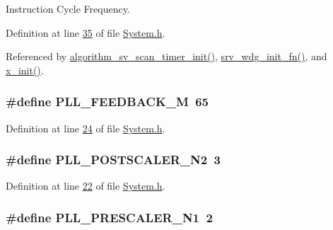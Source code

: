 Instruction Cycle Frequency. 



Definition at line \hyperlink{a00072_source_l00035}{35} of file \hyperlink{a00072_source}{System.\+h}.



Referenced by \hyperlink{a00038_source_l00543}{algorithm\+\_\+sv\+\_\+scan\+\_\+timer\+\_\+init()}, \hyperlink{a00066_source_l00096}{srv\+\_\+wdg\+\_\+init\+\_\+fn()}, and \hyperlink{a00037_source_l00135}{x\+\_\+init()}.

\hypertarget{a00072_a616f73024087cf3c328cde290113065a}{
\subsubsection[{P\+L\+L\+\_\+\+F\+E\+E\+D\+B\+A\+C\+K\+\_\+\+M}]{\setlength{\rightskip}{0pt plus 5cm}\#define P\+L\+L\+\_\+\+F\+E\+E\+D\+B\+A\+C\+K\+\_\+\+M~65}}\label{a00072_a616f73024087cf3c328cde290113065a}


Definition at line \hyperlink{a00072_source_l00024}{24} of file \hyperlink{a00072_source}{System.\+h}.

\hypertarget{a00072_a39c4650028eea85070da15dc0a967d8a}{
\subsubsection[{P\+L\+L\+\_\+\+P\+O\+S\+T\+S\+C\+A\+L\+E\+R\+\_\+\+N2}]{\setlength{\rightskip}{0pt plus 5cm}\#define P\+L\+L\+\_\+\+P\+O\+S\+T\+S\+C\+A\+L\+E\+R\+\_\+\+N2~3}}\label{a00072_a39c4650028eea85070da15dc0a967d8a}


Definition at line \hyperlink{a00072_source_l00022}{22} of file \hyperlink{a00072_source}{System.\+h}.

\hypertarget{a00072_a512a7743d94a6335ddd824498dc56df7}{
\subsubsection[{P\+L\+L\+\_\+\+P\+R\+E\+S\+C\+A\+L\+E\+R\+\_\+\+N1}]{\setlength{\rightskip}{0pt plus 5cm}\#define P\+L\+L\+\_\+\+P\+R\+E\+S\+C\+A\+L\+E\+R\+\_\+\+N1~2}}\label{a00072_a512a7743d94a6335ddd824498dc56df7}


